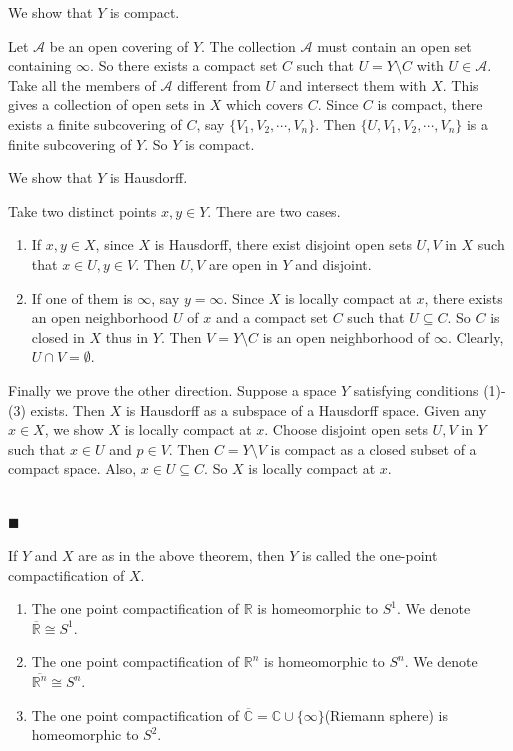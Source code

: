 \documentclass[main.tex]{subfiles}
\begin{document}
\par We show that $Y$ is compact. 
\par Let $\mathcal{A}$ be an open covering of $Y$. The collection $\mathcal{A}$ must contain an open set containing $\infty$. So there exists a compact set $C$ such that $U = Y \setminus C$ with $U \in \mathcal{A}$. Take all the members of $\mathcal{A}$ different from $U$ and intersect them with $X$. This gives a collection of open sets in $X$ which covers $C$. Since $C$ is compact, there exists a finite subcovering of $C$, say $\{V_1, V_2, \cdots, V_n\}$. Then $\{U, V_1, V_2, \cdots, V_n\}$ is a finite subcovering of $Y$. So $Y$ is compact.  
\par We show that $Y$ is Hausdorff.
\par Take two distinct points $x, y \in Y$. There are two cases.
\begin{enumerate}
    \item If $x, y \in X$, since $X$ is Hausdorff, there exist disjoint open sets $U, V$ in $X$ such that $x \in U, y \in V$. Then $U, V$ are open in $Y$ and disjoint.
    \item If one of them is $\infty$, say $y = \infty$. Since $X$ is locally compact at $x$, there exists an open neighborhood $U$ of $x$ and a compact set $C$ such that $U \subseteq C$. So $C$ is closed in $X$ thus in $Y$. Then $V = Y \setminus C$ is an open neighborhood of $\infty$. Clearly, $U \cap V = \emptyset$.
\end{enumerate}
\par Finally we prove the other direction. Suppose a space $Y$ satisfying conditions (1)-(3) exists. Then $X$ is Hausdorff as a subspace of a Hausdorff space. Given any $x \in X$, we show $X$ is locally compact at $x$. Choose disjoint open sets $U, V$ in $Y$ such that $x \in U$ and $p \in V$. Then $C = Y \setminus V$ is compact as a closed subset of a compact space. Also, $x \in U \subseteq C$. So $X$ is locally compact at $x$. 

\mbox{} \\ \null \hfill $\blacksquare$ 

\begin{definition}
    If $Y$ and $X$ are as in the above theorem, then $Y$ is called the one-point compactification of $X$. 
\end{definition}

\begin{example}
    \begin{enumerate}
        \item The one point compactification of $\mathbb{R}$ is homeomorphic to $S^1$. We denote $\overline{\mathbb{R}} \cong S^1$.
        \item The one point compactification of $\mathbb{R}^n$ is homeomorphic to $S^n$. We denote $\overline{\mathbb{R}^n} \cong S^n$. 
        \item The one point compactification of $\overline{\mathbb{C}} = \mathbb{C} \cup \{\infty\}$(Riemann sphere) is homeomorphic to $S^2$. 
    \end{enumerate}
\end{example}
\end{document}
